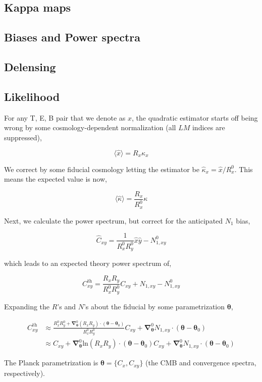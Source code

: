 \documentclass[a4paper, 11pt]{article}
\begin{document}
\subsection{Kappa maps}
\subsection{Biases and Power spectra}
\subsection{Delensing}
\subsection{Likelihood}

For any T, E, B pair that we denote as $x$, the quadratic estimator starts off being wrong by some cosmology-dependent normalization (all $LM$ indices are suppressed),

$$
\langle \hat{x} \rangle = R_{x} \kappa_x 
$$

We correct by some fiducial cosmology letting the estimator be $\hat{\kappa}_x = \hat{x} / R^0_x$. This means the expected value is now,

$$
\langle\hat\kappa\rangle = \frac{R_x}{R^0_x}\kappa 
$$

Next, we calculate the power spectrum, but correct for the anticipated $N_1$ bias,

$$
\hat{C}_{xy}=\frac{1}{R^0_xR^0_y}\hat{x}\hat{y} - N_{1,xy}^0
$$

which leads to an expected theory power spectrum of,

$$
C_{xy}^{\mathrm{th}}=\frac{R_xR_y}{R^0_xR^0_y}C_{xy} + N_{1,xy} - N_{1,xy}^0
$$

Expanding the $R$'s and $N$'s about the fiducial by some parametrization $\boldsymbol{\theta}$,

\newcommand{\bth}{\boldsymbol{\theta}}
\newcommand{\bna}{\boldsymbol{\nabla}}

\begin{align*}
C_{xy}^{\mathrm{th}}&\approx\frac{R^0_xR^0_y+\bna^0_{\bth} (R_xR_y)\cdot (\bth-\bth_0)}{R^0_xR^0_y}C_{xy} + \bna^0_{\bth} N_{1,xy}\cdot (\bth-\bth_0) \\
&\approx C_{xy}+\bna^0_{\bth} \mathrm{ln}(R_xR_y)\cdot (\bth-\bth_0)C_{xy} + \bna^0_{\bth} N_{1,xy}\cdot (\bth-\bth_0)
\end{align*}

The Planck parametrization is $\bth=\{C_x, C_{xy}\}$ (the CMB and convergence spectra, respectively).
\end{document}
